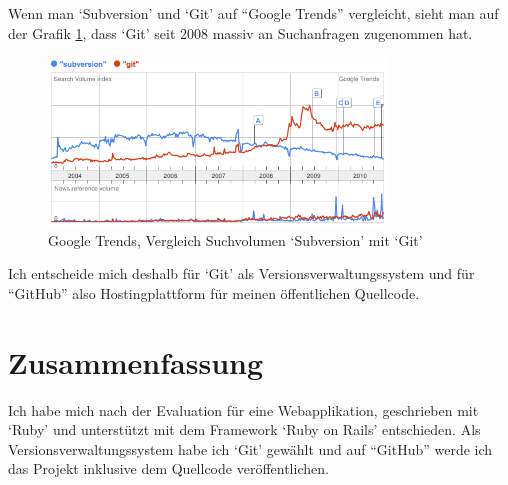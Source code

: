 Wenn man `Subversion' und `Git' auf ``Google Trends'' vergleicht, sieht man auf
der Grafik \ref{svn_vs_git}, dass `Git' seit 2008 massiv an Suchanfragen zugenommen
hat.

\begin{figure}[ht]
    \begin{center}
        \includegraphics[width=0.8\textwidth,angle=0]{./bilder/svn_vs_git.png}
        \caption{Google Trends, Vergleich Suchvolumen `Subversion' mit `Git'}
        \label{svn_vs_git}
    \end{center}
\end{figure}

Ich entscheide mich deshalb für `Git' als Versionsverwaltungssystem und für ``GitHub''
also Hostingplattform für meinen öffentlichen Quellcode.

\section{Zusammenfassung}
Ich habe mich nach der Evaluation für eine Webapplikation, geschrieben mit `Ruby'
und unterstützt mit dem Framework `Ruby on Rails' entschieden. Als Versionsverwaltungssystem
habe ich `Git' gewählt und auf ``GitHub'' werde ich das Projekt inklusive dem Quellcode
veröffentlichen.